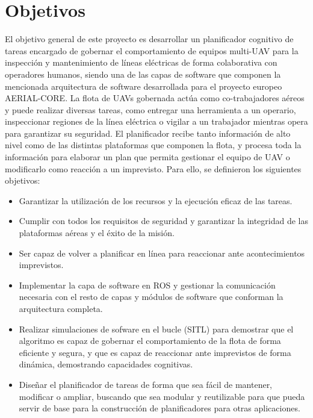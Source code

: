 \documentclass[fontsize=11pt, English=false, Español=true, Myfinal=true, twoside, numbers=noenddot]{scrbook}
\begin{document}
\section{Objetivos}
\label{sec:Objectives}
El objetivo general de este proyecto es desarrollar un planificador cognitivo de tareas encargado de gobernar el comportamiento de equipos multi-\gls{UAV} para la inspección y mantenimiento de líneas eléctricas de forma colaborativa con operadores humanos, siendo una de las capas de software que componen la mencionada arquitectura de software desarrollada para el proyecto europeo AERIAL-CORE. La flota de \glspl{UAV} gobernada actúa como co-trabajadores aéreos y puede realizar diversas tareas, como entregar una herramienta a un operario, inspeccionar regiones de la línea eléctrica o vigilar a un trabajador mientras opera para garantizar su seguridad. El planificador recibe tanto información de alto nivel como de las distintas plataformas que componen la flota, y procesa toda la información para elaborar un plan que permita gestionar el equipo de \gls{UAV} o modificarlo como reacción a un imprevisto. Para ello, se definieron los siguientes objetivos:

\begin{itemize}
    \item Garantizar la utilización de los recursos y la ejecución eficaz de las tareas.
    \item Cumplir con todos los requisitos de seguridad y garantizar la integridad de las plataformas aéreas y el éxito de la misión.
    \item Ser capaz de volver a planificar en línea para reaccionar ante acontecimientos imprevistos.
    \item Implementar la capa de software en \gls{ROS} y gestionar la comunicación necesaria con el resto de capas y módulos de software que conforman la arquitectura completa.
    \item Realizar simulaciones de sofware en el bucle (\gls{SITL}) para demostrar que el algoritmo es capaz de gobernar el comportamiento de la flota de forma eficiente y segura, y que es capaz de reaccionar ante imprevistos de forma dinámica, demostrando capacidades cognitivas.
    \item Diseñar el planificador de tareas de forma que sea fácil de mantener, modificar o ampliar, buscando que sea modular y reutilizable para que pueda servir de base para la construcción de planificadores para otras aplicaciones.
\end{itemize}
\end{document}
